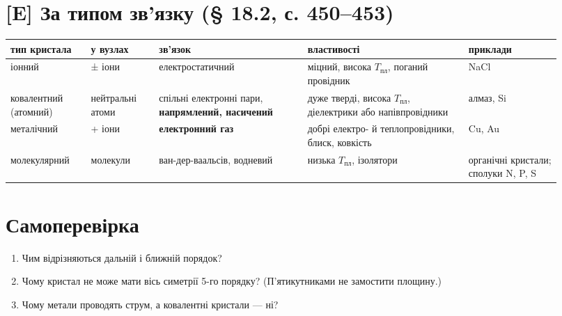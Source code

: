 \documentclass[11pt,a4paper,oneside]{book}
\begin{document}
\section*{[E] За типом зв'язку (§ 18.2, с. 450–453)}
{\footnotesize
\begin{longtable}{>{\raggedright\arraybackslash}p{0.138\linewidth}>{\raggedright\arraybackslash}p{0.115\linewidth}>{\raggedright\arraybackslash}p{0.244\linewidth}>{\raggedright\arraybackslash}p{0.264\linewidth}>{\raggedright\arraybackslash}p{0.159\linewidth}}
\toprule
\textbf{тип кристала} & \textbf{у вузлах} & \textbf{зв'язок} & \textbf{властивості} & \textbf{приклади} \\
\midrule
\endhead
іонний & ± іони & електростатичний & міцний, висока $T_{\text{пл}}$, поганий провідник & NaCl \\
ковалентний (атомний) & нейтральні атоми & спільні електронні пари, \textbf{напрямлений, насичений} & дуже тверді, висока $T_{\text{пл}}$, діелектрики або напівпровідники & алмаз, Si \\
металічний & + іони & \textbf{електронний газ} & добрі електро- й теплопровідники, блиск, ковкість & Cu, Au \\
молекулярний & молекули & ван-дер-ваальсів, водневий & низька $T_{\text{пл}}$, ізолятори & органічні кристали; сполуки N, P, S \\
\bottomrule
\end{longtable}
}

\section*{Самоперевірка}
\begin{enumerate}
\item Чим відрізняються дальній і ближній порядок?
\item Чому кристал не може мати вісь симетрії 5-го порядку? (П'ятикутниками не замостити площину.)
\item Чому метали проводять струм, а ковалентні кристали — ні?
\end{enumerate}
\end{document}
